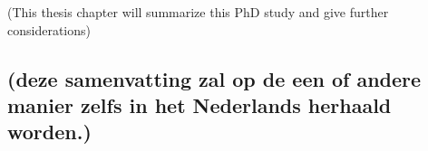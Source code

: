 (This thesis chapter will summarize this PhD study and give further
considerations)

\hypertarget{deze-samenvatting-zal-op-de-een-of-andere-manier-zelfs-in-het-nederlands-herhaald-worden.}{%
\subsection{(deze samenvatting zal op de een of andere manier zelfs in
het Nederlands herhaald
worden.)}\label{deze-samenvatting-zal-op-de-een-of-andere-manier-zelfs-in-het-nederlands-herhaald-worden.}}
